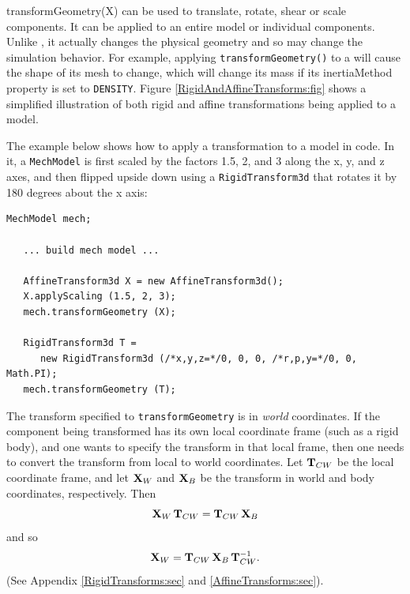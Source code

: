 %
{transformGeometry(X)}
can be used to translate, rotate, shear or scale components. It
can be applied to an entire model or individual components. Unlike
, it
actually changes the physical geometry and so may change the
simulation behavior. For example, applying {\tt transformGeometry()}
to a  will cause the
shape of its mesh to change, which will change its mass if its {\sf
inertiaMethod} property is set to {\tt DENSITY}.
Figure \ref{RigidAndAffineTransforms:fig} shows a simplified
illustration of both rigid and affine transformations being applied to
a model.

The example below shows how to apply a transformation to a model in
code. In it, a {\tt MechModel} is first scaled by the factors 1.5, 2,
and 3 along the x, y, and z axes, and then flipped upside down using a
{\tt RigidTransform3d} that rotates it by 180 degrees about the x
axis:
%
\begin{lstlisting}[]
   MechModel mech;

   ... build mech model ...

   AffineTransform3d X = new AffineTransform3d();
   X.applyScaling (1.5, 2, 3);
   mech.transformGeometry (X);
   
   RigidTransform3d T = 
      new RigidTransform3d (/*x,y,z=*/0, 0, 0, /*r,p,y=*/0, 0, Math.PI);
   mech.transformGeometry (T);
\end{lstlisting}
%

\begin{sideblock}
The transform specified to {\tt transformGeometry} is in {\it world}
coordinates. If the component being transformed has its own
local coordinate frame (such as a rigid body), and one wants to
specify the transform in that local frame, then one needs to convert
the transform from local to world coordinates. Let ${\bf T}_{CW}$ be the
local coordinate frame, and let ${\bf X}_W$ and ${\bf X}_B$ be the transform in
world and body coordinates, respectively. Then
%
\begin{equation*}
{\bf X}_W \, {\bf T}_{CW} = {\bf T}_{CW} \, {\bf X}_B
\end{equation*}
%
and so
%
\begin{equation*}
{\bf X}_W  = {\bf T}_{CW} \, {\bf X}_B \, {\bf T}_{CW}^{-1}.
\end{equation*}
%
(See Appendix \ref{RigidTransforms:sec}
and \ref{AffineTransforms:sec}).  
\end{sideblock}

